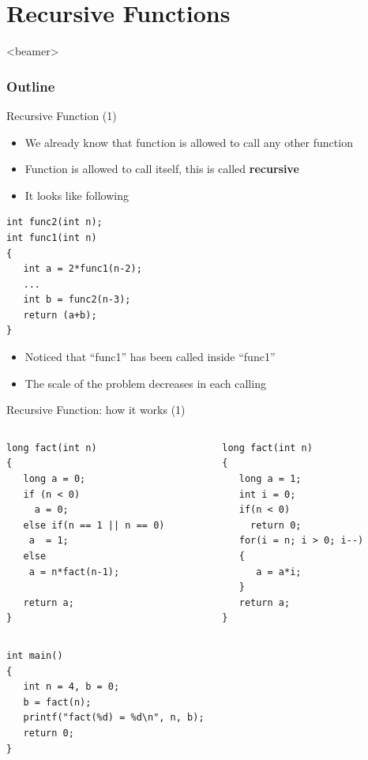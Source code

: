\section{Recursive Functions}
\label{sec:recurs}
\begin{frame}<beamer>
    \frametitle{Outline}
    \tableofcontents[currentsection]
\end{frame}

\begin{frame}[fragile]{Recursive Function (1)}
\begin{itemize}
	\item {We already know that function is allowed to call any other function}
	\item {Function is allowed to call itself, this is called \textbf{recursive}}
	\item {It looks like following}
\end{itemize}
\begin{lstlisting}
int func2(int n);
int func1(int n)
{
   int a = 2*func1(n-2);
   ...
   int b = func2(n-3);
   return (a+b);
}
\end{lstlisting}

\begin{itemize}
	\item {Noticed that ``func1'' has been called inside ``func1''}
	\item {The scale of the problem decreases in each calling}
\end{itemize}

\end{frame}

\begin{frame}[fragile]{Recursive Function: how it works (1)}
\vspace{-0.08in}
\begin{columns}
\begin{column}{0.48\linewidth}
\begin{lstlisting}
long fact(int n)
{
   long a = 0;
   if (n < 0)
     a = 0;
   else if(n == 1 || n == 0)
    a  = 1;
   else
    a = n*fact(n-1);
    
   return a;
}
\end{lstlisting}
\end{column}
\begin{column}{0.45\linewidth}
\begin{lstlisting}
long fact(int n)
{
   long a = 1;
   int i = 0;
   if(n < 0)
     return 0;
   for(i = n; i > 0; i--)
   {
      a = a*i;
   }
   return a;
}
\end{lstlisting}
\end{column}
\end{columns}
\vspace{-0.16in}
\begin{lstlisting}
int main()
{
   int n = 4, b = 0;
   b = fact(n);
   printf("fact(%d) = %d\n", n, b);
   return 0;
}
\end{lstlisting}
\end{frame}

